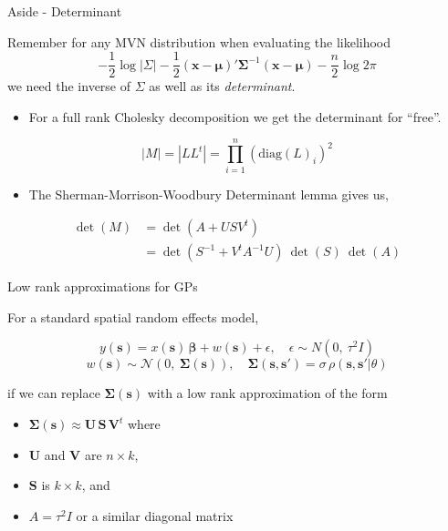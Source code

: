 \documentclass[11pt,ignorenonframetext,]{beamer}
\providecommand{\tightlist}{%
  \setlength{\itemsep}{0pt}\setlength{\parskip}{0pt}}
\begin{document}
\begin{frame}{Aside - Determinant}
\protect\hypertarget{aside---determinant}{}

Remember for any MVN distribution when evaluating the likelihood
\[ -\frac{1}{2} \log {|\Sigma|} - \frac{1}{2} (\symbf{x}-\symbf{\mu})' {\symbf{\Sigma}^{-1}} (\symbf{x}-\symbf{\mu}) - \frac{n}{2}\log 2\pi\]
we need the inverse of \(\Sigma\) as well as its \emph{determinant}.

\pause

\begin{itemize}
\tightlist
\item
  For a full rank Cholesky decomposition we get the determinant for
  ``free''.
\end{itemize}

\vspace{-3mm}

\[|M| = |LL^t| = \prod_{i=1}^n \left(\text{diag}(L)_i\right)^2\]

\pause

\begin{itemize}
\tightlist
\item
  The Sherman-Morrison-Woodbury Determinant lemma gives us,
\end{itemize}

\vspace{-3mm}

\[\begin{aligned}
\det(M) 
  &= \det({A} + {U} {S} {V^t}) \\
  &= \det(S^{-1} + V^t A^{-1} U) ~ \det(S) ~ \det(A)
\end{aligned}\]

\end{frame}

\begin{frame}[t]{Low rank approximations for GPs}
\protect\hypertarget{low-rank-approximations-for-gps}{}

For a standard spatial random effects model,

\[ y(\symbf{s}) = x(\symbf{s}) \, \symbf{\beta} + w(\symbf{s}) + \epsilon, \quad \epsilon \sim N(0,~\tau^2 I) \]
\[ w(\symbf{s}) \sim \mathcal{N}(0,~\symbf{\Sigma}(\symbf{s})), \quad \symbf{\Sigma}(\symbf{s},\symbf{s}')=\sigma\,\rho(\symbf{s},\symbf{s}'|\theta) \]

if we can replace \(\symbf{\Sigma}(\symbf{s})\) with a low rank
approximation of the form

\begin{itemize}
\item
  \(\symbf{\Sigma}(\symbf{s}) \approx \symbf{U}\,\symbf{S}\,\symbf{V}^t\)
  where
\item
  \(\symbf{U}\) and \(\symbf{V}\) are \(n \times k\),
\item
  \(\symbf{S}\) is \(k \times k\), and
\item
  \(A = \tau^2 I\) or a similar diagonal matrix
\end{itemize}

\end{frame}
\end{document}
